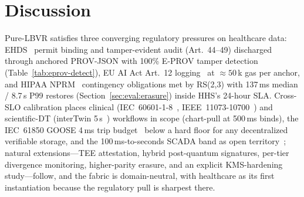 \section{Discussion}
\label{sec:discussion}

Pure-LBVR satisfies three converging regulatory pressures on healthcare data: EHDS~\cite{ehds2025reg} permit binding and tamper-evident audit (Art.\ 44--49) discharged through anchored PROV-JSON with 100\% E-PROV tamper detection (Table~\ref{tab:eprov-detect}), EU AI Act Art.\ 12 logging~\cite{aiact2024} at $\approx 50$\,k gas per anchor, and HIPAA NPRM~\cite{hipaanprm2025} contingency obligations met by RS(2,3) with 137\,ms median / 8.7\,s P99 restores (Section~\ref{sec:eval:erasure}) inside HHS's 24-hour SLA. Cross-SLO calibration places clinical (IEC~60601-1-8~\cite{iec60601-1-8}, IEEE~11073-10700~\cite{ieee11073-10700}) and scientific-DT (interTwin 5\,s~\cite{manzi2025intertwin}) workflows in scope (chart-pull at 500\,ms binds), the IEC~61850 GOOSE 4\,ms trip budget~\cite{iec61850goose} below a hard floor for any decentralized verifiable storage, and the 100\,ms-to-seconds SCADA band as open territory~\cite{thwe2025dtps}; natural extensions---TEE attestation, hybrid post-quantum signatures, per-tier divergence monitoring, higher-parity erasure, and an explicit KMS-hardening study---follow, and the fabric is domain-neutral, with healthcare as its first instantiation because the regulatory pull is sharpest there.
